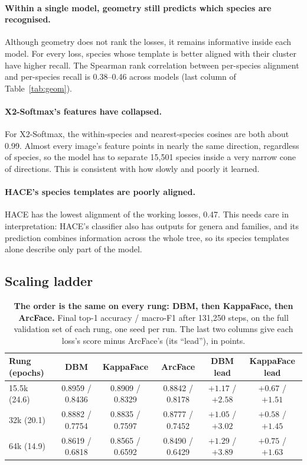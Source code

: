 \documentclass[11pt]{article}
\begin{document}
\paragraph{Within a single model, geometry still predicts which species are recognised.}
Although geometry does not rank the losses, it remains informative inside each model.
For every loss, species whose template is better aligned with their cluster have higher
recall. The Spearman rank correlation between per-species alignment and per-species
recall is 0.38--0.46 across models (last column of Table~\ref{tab:geom}).

\paragraph{X2-Softmax's features have collapsed.} For X2-Softmax, the within-species and
nearest-species cosines are both about 0.99. Almost every image's feature points in
nearly the same direction, regardless of species, so the model has to separate 15{,}501
species inside a very narrow cone of directions. This is consistent with how slowly and
poorly it learned.

\paragraph{HACE's species templates are poorly aligned.} HACE has the lowest alignment
of the working losses, 0.47. This needs care in interpretation: HACE's classifier also
has outputs for genera and families, and its prediction combines information across the
whole tree, so its species templates alone describe only part of the model.

\subsection{Scaling ladder}
\label{sec:res-ladder}

\begin{table}[t]
\centering
\small
\caption{\textbf{The order is the same on every rung: DBM, then KappaFace, then
ArcFace.} Final top-1 accuracy / macro-F1 after 131{,}250 steps, on the full validation
set of each rung, one seed per run. The last two columns give each loss's score minus
ArcFace's (its ``lead''), in points.}
\label{tab:ladder}
\footnotesize
\setlength{\tabcolsep}{2pt}
\begin{tabular}{@{}lccccc@{}}
\toprule
Rung (epochs) & DBM & KappaFace & ArcFace & DBM lead & KappaFace lead \\
\midrule
15.5k (24.6) & 0.8959 / 0.8436 & 0.8909 / 0.8329 & 0.8842 / 0.8178 & $+1.17$ / $+2.58$ & $+0.67$ / $+1.51$ \\
32k (20.1)   & 0.8882 / 0.7754 & 0.8835 / 0.7597 & 0.8777 / 0.7452 & $+1.05$ / $+3.02$ & $+0.58$ / $+1.45$ \\
64k (14.9)   & 0.8619 / 0.6818 & 0.8565 / 0.6592 & 0.8490 / 0.6429 & $+1.29$ / $+3.89$ & $+0.75$ / $+1.63$ \\
\bottomrule
\end{tabular}
\end{table}
\end{document}
